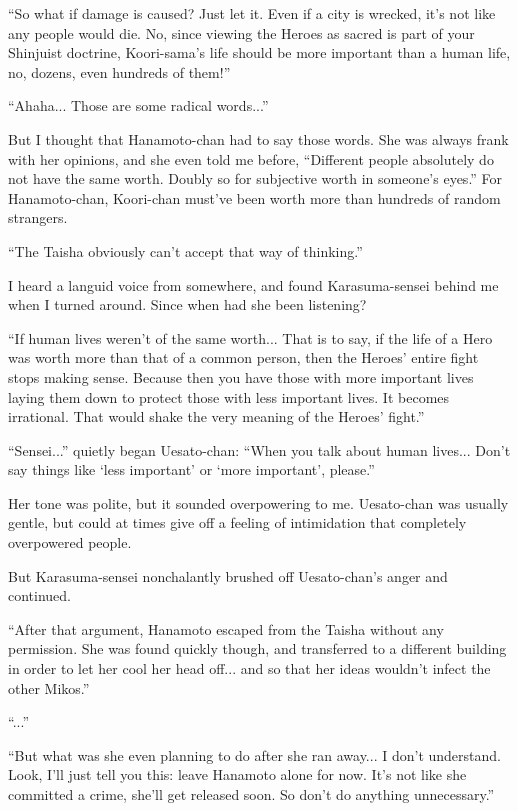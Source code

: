 ``So what if damage is caused? Just let it. Even if a city is wrecked, it's not like any people would die. No, since viewing the Heroes as sacred is part of your Shinjuist doctrine, Koori-sama's life should be more important than a human life, no, dozens, even hundreds of them!''

``Ahaha... Those are some radical words...''

But I thought that Hanamoto-chan had to say those words. She was always frank with her opinions, and she even told me before, ``Different people absolutely do not have the same worth. Doubly so for subjective worth in someone's eyes.'' For Hanamoto-chan, Koori-chan must've been worth more than hundreds of random strangers.

``The Taisha obviously can't accept that way of thinking.''

I heard a languid voice from somewhere, and found Karasuma-sensei behind me when I turned around. Since when had she been listening?

``If human lives weren't of the same worth... That is to say, if the life of a Hero was worth more than that of a common person, then the Heroes' entire fight stops making sense. Because then you have those with more important lives laying them down to protect those with less important lives. It becomes irrational. That would shake the very meaning of the Heroes' fight.''

``Sensei...'' quietly began Uesato-chan: ``When you talk about human lives... Don't say things like `less important' or `more important', please.''

Her tone was polite, but it sounded overpowering to me. Uesato-chan was usually gentle, but could at times give off a feeling of intimidation that completely overpowered people.

But Karasuma-sensei nonchalantly brushed off Uesato-chan's anger and continued.

``After that argument, Hanamoto escaped from the Taisha without any permission. She was found quickly though, and transferred to a different building in order to let her cool her head off... and so that her ideas wouldn't infect the other Mikos.''

``...''

``But what was she even planning to do after she ran away... I don't understand. Look, I'll just tell you this: leave Hanamoto alone for now. It's not like she committed a crime, she'll get released soon. So don't do anything unnecessary.''

